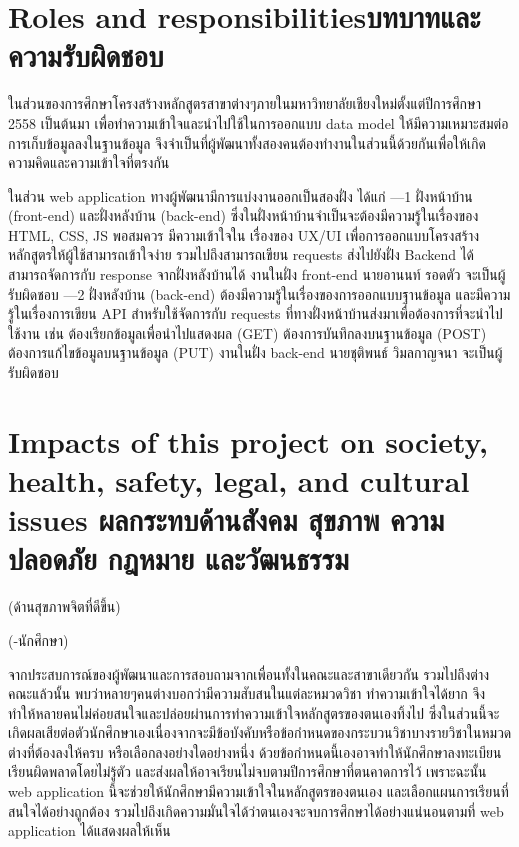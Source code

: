 \section{\ifenglish Roles and responsibilities\else บทบาทและความรับผิดชอบ\fi}
{ในส่วนของการศึกษาโครงสร้างหลักสูตรสาขาต่างๆภายในมหาวิทยาลัยเชียงใหม่ตั้งแต่ปีการศึกษา 2558 เป็นต้นมา เพื่อทำความเข้าใจและนําไปใช้ในการออกแบบ data model ให้มีความเหมาะสมต่อการเก็บข้อมูลลงในฐานข้อมูล จึงจำเป็นที่ผู้พัฒนาทั้งสองคนต้องทำงานในส่วนนี้ด้วยกันเพื่อให้เกิดความคิดและความเข้าใจที่ตรงกัน }

{ในส่วน web application ทางผู้พัฒนามีการแบ่งงานออกเป็นสองฝั่ง ได้แก่ }
{---1 ฝั่งหน้าบ้าน (front-end) และฝั่งหลังบ้าน (back-end) ซึ่งในฝั่งหน้าบ้านจําเป็นจะต้องมีความรู้ในเรื่องของ HTML, CSS, JS พอสมควร มีความเข้าใจใน เรื่องของ UX/UI เพื่อการออกแบบโครงสร้างหลักสูตรให้ผู้ใช้สามารถเข้าใจง่าย รวมไปถึงสามารถเขียน requests ส่งไปยังฝั่ง Backend ได้ สามารถจัดการกับ response จากฝั่งหลังบ้านได้ งานในฝั่ง front-end นายอานนท์ รอดตัว จะเป็นผู้รับผิดชอบ}
{---2 ฝั่งหลังบ้าน (back-end) ต้องมีความรู้ในเรื่องของการออกแบบฐานข้อมูล และมีความรู้ในเรื่องการเขียน API สําหรับใช้จัดการกับ requests ที่ทางฝั่งหน้าบ้านส่งมาเพื่อต้องการที่จะนําไปใช้งาน เช่น ต้องเรียกข้อมูลเพื่อนำไปแสดงผล (GET) ต้องการบันทึกลงบนฐานข้อมูล (POST) ต้องการแก้ไขข้อมูลบนฐานข้อมูล (PUT) งานในฝั่ง back-end นายชุติพนธ์ วิมลกาญจนา จะเป็นผู้รับผิดชอบ}
\section{\ifenglish%
Impacts of this project on society, health, safety, legal, and cultural issues
\else%
ผลกระทบด้านสังคม สุขภาพ ความปลอดภัย กฎหมาย และวัฒนธรรม\fi}

{(ด้านสุขภาพจิตที่ดีขึ้น) }

{(-นักศึกษา)}

{จากประสบการณ์ของผู้พัฒนาและการสอบถามจากเพื่อนทั้งในคณะและสาขาเดียวกัน รวมไปถึงต่างคณะแล้วนั้น พบว่าหลายๆคนต่างบอกว่ามีความสับสนในแต่ละหมวดวิชา ทำความเข้าใจได้ยาก จึงทำให้หลายคนไม่ค่อยสนใจและปล่อยผ่านการทำความเข้าใจหลักสูตรของตนเองทิ้งไป  ซึ่งในส่วนนี้จะเกิดผลเสียต่อตัวนักศึกษาเองเนื่องจากจะมีข้อบังคับหรือข้อกำหนดของกระบวนวิชาบางรายวิชาในหมวดต่างที่ต้องลงให้ครบ หรือเลือกลงอย่างใดอย่างหนึ่ง ด้วยข้อกำหนดนี้เองอาจทำให้นักศึกษาลงทะเบียนเรียนผิดพลาดโดยไม่รู้ตัว และส่งผลให้อาจเรียนไม่จบตามปีการศึกษาที่ตนคาดการไว้ เพราะฉะนั้น web application นี้จะช่วยให้นักศึกษามีความเข้าใจในหลักสูตรของตนเอง และเลือกแผนการเรียนที่สนใจได้อย่างถูกต้อง รวมไปถึงเกิดความมั่นใจได้ว่าตนเองจะจบการศึกษาได้อย่างแน่นอนตามที่ web application ได้แสดงผลให้เห็น  }

